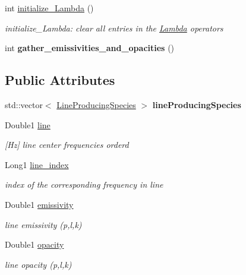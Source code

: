 \begin{DoxyCompactItemize}
\mbox{\label{structLines_a9d524958a8b1fcd3c9e25948ca7d1f5b}} 
int \mbox{\hyperlink{structLines_a9d524958a8b1fcd3c9e25948ca7d1f5b}{initialize\+\_\+\+Lambda}} ()
\begin{DoxyCompactList}\small\item\em initialize\+\_\+\+Lambda\+: clear all entries in the \mbox{\hyperlink{structLambda}{Lambda}} operators \end{DoxyCompactList}\item 
\mbox{\label{structLines_a5076637cc6088a15e539632de7c2f42c}} 
int {\bfseries gather\+\_\+emissivities\+\_\+and\+\_\+opacities} ()
\end{DoxyCompactItemize}
\subsection*{Public Attributes}
\begin{DoxyCompactItemize}
\item 
\mbox{\label{structLines_a5dbc4f4f8b9bcb91844bafafcb901175}} 
std\+::vector$<$ \mbox{\hyperlink{structLineProducingSpecies}{Line\+Producing\+Species}} $>$ {\bfseries line\+Producing\+Species}
\item 
\mbox{\label{structLines_a10eac926d9d3e56f65d0a0ad7a40777c}} 
Double1 \mbox{\hyperlink{structLines_a10eac926d9d3e56f65d0a0ad7a40777c}{line}}
\begin{DoxyCompactList}\small\item\em \mbox{[}Hz\mbox{]} line center frequencies orderd \end{DoxyCompactList}\item 
\mbox{\label{structLines_aec3fe598ca48779b70a16219871ec98d}} 
Long1 \mbox{\hyperlink{structLines_aec3fe598ca48779b70a16219871ec98d}{line\+\_\+index}}
\begin{DoxyCompactList}\small\item\em index of the corresponding frequency in line \end{DoxyCompactList}\item 
\mbox{\label{structLines_a9a391401fe052994ec544a06a5ea9934}} 
Double1 \mbox{\hyperlink{structLines_a9a391401fe052994ec544a06a5ea9934}{emissivity}}
\begin{DoxyCompactList}\small\item\em line emissivity (p,l,k) \end{DoxyCompactList}\item 
\mbox{\label{structLines_addf752e735e59bdef808a69cbc4c9dc9}} 
Double1 \mbox{\hyperlink{structLines_addf752e735e59bdef808a69cbc4c9dc9}{opacity}}
\begin{DoxyCompactList}\small\item\em line opacity (p,l,k) \end{DoxyCompactList}\end{DoxyCompactItemize}


